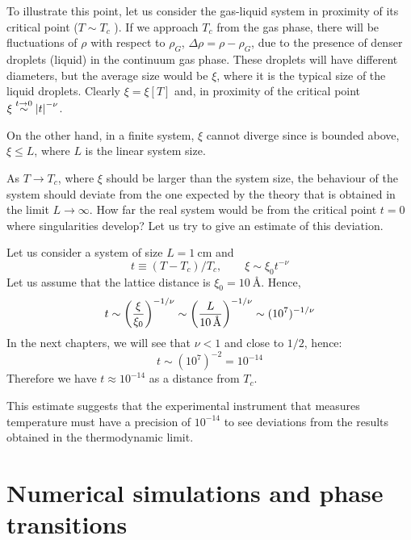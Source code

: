 \documentclass[../../Main/Main.tex]{subfiles}
\begin{document}
To illustrate this point, let us consider the gas-liquid system in proximity of its critical point (\( T \sim T_c \) ). If we approach \( T_c \) from the gas phase, there will be fluctuations of \( \rho  \) with respect to \( \rho _G \), \( \Delta \rho = \rho - \rho _G \), due to the presence of denser droplets (liquid) in the continuum gas phase.
These droplets will have different diameters, but the average size would be \( \xi  \), where it is the typical size of the liquid droplets.
Clearly \( \xi = \xi [T] \) and, in proximity of the critical point \( \xi  \overset{t \rightarrow 0}{\sim } \abs{t}^{-\nu }   \).

On the other hand, in a finite system, \( \xi  \) cannot diverge since is bounded above, \( \xi \le L \), where \( L \) is the linear system size.

As \( T \rightarrow T_c \), where \( \xi  \) should be larger than the system size, the behaviour of the system should deviate from the one expected by the theory that is obtained in the limit \( L \rightarrow \infty  \). How far the real system would be from the critical point \( t=0 \) where singularities develop? Let us try to give an estimate of this deviation.

 Let us consider a system of size \( L = \SI{1}{\cm}  \) and
\begin{equation*}
  t \equiv (T-T_c)/T_c, \qquad \xi \sim \xi _0 t^{-\nu }
\end{equation*}
Let us assume that the lattice distance is \( \xi _0 = \SI{10}{\angstrom}  \). Hence,
 \begin{equation}
   t \sim \qty(\frac{\xi }{\xi _0})^{-1/\nu } \sim \qty(\frac{L}{\SI{10}{\angstrom} })^{-1/\nu } \sim (10^{7})^{-1/\nu }
 \end{equation}
In the next chapters, we will see that \( \nu < 1 \) and close to \( 1/2 \), hence:
\begin{equation*}
  t \sim (10^{7})^{-2 } = 10^{-14}
\end{equation*}
Therefore we have \( t \approx 10^{-14} \)  as a distance from \( T_c \).

This estimate suggests that the experimental instrument that measures temperature must have a precision of \( 10^{-14} \)  to see deviations from the results obtained in the thermodynamic limit.


\clearpage

\section{Numerical simulations and phase transitions}
\end{document}
